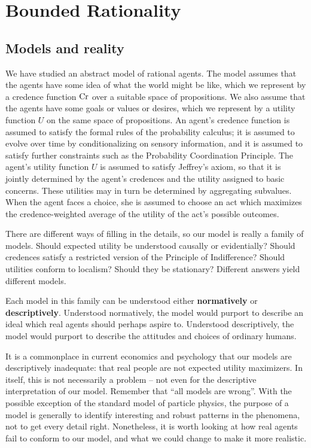 \chapter{Bounded Rationality}

\section{Models and reality}

We have studied an abstract model of rational agents. The model
assumes that the agents have some idea of what the
world might be like, which we represent by a credence function $\text{Cr}$
over a suitable space of propositions. We also assume that the agents
have some goals or values or desires, which we represent by a utility
function $U$ on the same space of propositions. An agent's credence
function is assumed to satisfy the formal rules of the probability
calculus; it is assumed to evolve over time by conditionalizing on
sensory information, and it is assumed to satisfy further constraints
such as the Probability Coordination Principle. The agent's utility
function $U$ is assumed to satisfy Jeffrey's axiom, so that it is
jointly determined by the agent's credences and the utility assigned
to basic concerns. These utilities may in turn be determined by
aggregating subvalues. When the agent faces a choice, she is assumed
to choose an act which maximizes the credence-weighted average of the
utility of the act's possible outcomes.

There are different ways of filling in the details, so our model is
really a family of models. Should expected utility be understood
causally or evidentially? Should credences satisfy a restricted
version of the Principle of Indifference? Should utilities conform to
localism? Should they be stationary? Different answers yield different
models.

Each model in this family can be understood either
\textbf{normatively} or \textbf{descriptively}. Understood
normatively, the model would purport to describe an ideal which real
agents should perhaps aspire to. Understood descriptively, the model
would purport to describe the attitudes and choices of ordinary
humans.

It is a commonplace in current economics and psychology that our
models are descriptively inadequate: that real people are not expected
utility maximizers. In itself, this is not necessarily a problem --
not even for the descriptive interpretation of our model. Remember
that ``all models are wrong''. With the possible exception of the
standard model of particle physics, the purpose of a model is
generally to identify interesting and robust patterns in the
phenomena, not to get every detail right.  Nonetheless, it is worth
looking at how real agents fail to conform to our model, and what we
could change to make it more realistic.

